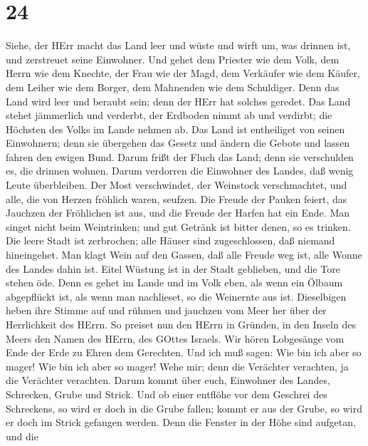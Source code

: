 \hypertarget{section-23}{%
\section{24}\label{section-23}}

 Siehe, der HErr macht das Land leer und wüste und wirft um,
was drinnen ist, und zerstreuet seine Einwohner.  Und gehet
dem Priester wie dem Volk, dem Herrn wie dem Knechte, der Frau wie der
Magd, dem Verkäufer wie dem Käufer, dem Leiher wie dem Borger, dem
Mahnenden wie dem Schuldiger.  Denn das Land wird leer und
beraubt sein; denn der HErr hat solches geredet.  Das Land
stehet jämmerlich und verderbt, der Erdboden nimmt ab und verdirbt; die
Höchsten des Volks im Lande nehmen ab.  Das Land ist
entheiliget von seinen Einwohnern; denn sie übergehen das Gesetz und
ändern die Gebote und lassen fahren den ewigen Bund.  Darum
frißt der Fluch das Land; denn sie verschulden es, die drinnen wohnen.
Darum verdorren die Einwohner des Landes, daß wenig Leute überbleiben.
 Der Most verschwindet, der Weinstock verschmachtet, und
alle, die von Herzen fröhlich waren, seufzen.  Die Freude
der Pauken feiert, das Jauchzen der Fröhlichen ist aus, und die Freude
der Harfen hat ein Ende.  Man singet nicht beim Weintrinken;
und gut Getränk ist bitter denen, so es trinken.  Die leere
Stadt ist zerbrochen; alle Häuser sind zugeschlossen, daß niemand
hineingehet.  Man klagt Wein auf den Gassen, daß alle
Freude weg ist, alle Wonne des Landes dahin ist.  Eitel
Wüstung ist in der Stadt geblieben, und die Tore stehen öde.
 Denn es gehet im Lande und im Volk eben, als wenn ein
Ölbaum abgepflückt ist, als wenn man nachlieset, so die Weinernte aus
ist.  Dieselbigen heben ihre Stimme auf und rühmen und
jauchzen vom Meer her über der Herrlichkeit des HErrn.  So
preiset nun den HErrn in Gründen, in den Inseln des Meers den Namen des
HErrn, des GOttes Israels.  Wir hören Lobgesänge vom Ende
der Erde zu Ehren dem Gerechten. Und ich muß sagen: Wie bin ich aber so
mager! Wie bin ich aber so mager! Wehe mir; denn die Verächter
verachten, ja die Verächter verachten.  Darum kommt über
euch, Einwohner des Landes, Schrecken, Grube und Strick. 
Und ob einer entflöhe vor dem Geschrei des Schreckens, so wird er doch
in die Grube fallen; kommt er aus der Grube, so wird er doch im Strick
gefangen werden. Denn die Fenster in der Höhe sind aufgetan, und die
